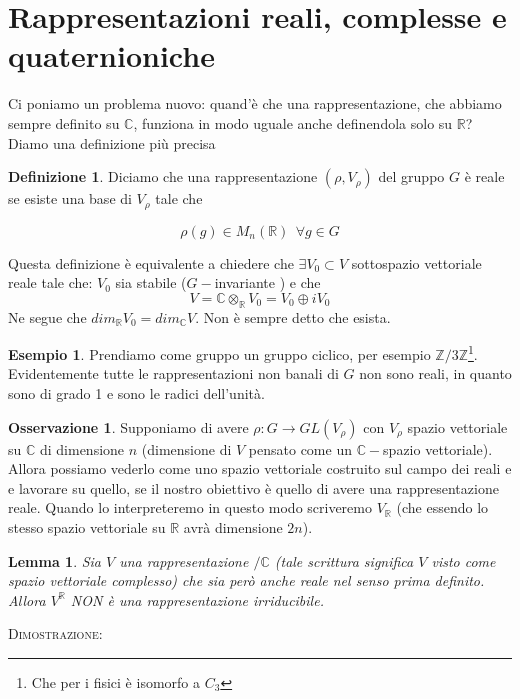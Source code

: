 \documentclass[11pt]{article}
\theoremstyle{plain}
\newtheorem{lemma}[thm]{Lemma}
\theoremstyle{definition}
\newtheorem{defn}{Definizione}[section]
\newtheorem{exmp}{Esempio}[section]
\newtheorem*{rem}{Osservazione}
\theoremstyle{remark}
\newcommand{\C}{\mathbb{C}}
\newcommand{\R}{\mathbb{R}}
\newcommand{\Z}{\mathbb{Z}}
\begin{document}
\newpage
\section{Rappresentazioni reali, complesse e quaternioniche}

Ci poniamo un problema nuovo: quand'è che una rappresentazione, che abbiamo sempre definito su $\C$, funziona in modo uguale anche definendola solo su $\R$? Diamo una definizione più precisa

\begin{defn}
Diciamo che una rappresentazione $(\rho, V_\rho)$ del gruppo $G$ è reale se esiste una base di $V_\rho$ tale che

\[ \rho(g) \in M_n(\R) \ \ \forall g \in G\]

\label{def: rappr reale}
\end{defn}
Questa definizione è equivalente a chiedere che $\exists V_0 \subset V$ sottospazio vettoriale reale tale che: $V_0$ sia stabile ($G-$invariante ) e che 
\[ V = \C \otimes_\R V_0 = V_0 \oplus i V_0\]
Ne segue che $dim_\R V_0=dim_\C V$. Non è sempre detto che esista.
\begin{exmp}
Prendiamo come gruppo un gruppo ciclico, per esempio $\Z / 3\Z$\footnote{Che per i fisici è isomorfo a $C_3$}. Evidentemente tutte le rappresentazioni non banali di $G$ non sono reali, in quanto sono di grado 1 e sono le radici dell'unità.

\end{exmp}


\begin{rem}
Supponiamo di avere $\rho: G \to GL(V_\rho)$ con $V_\rho$ spazio vettoriale su $\C$ di dimensione $n$ (dimensione di $V$ pensato come un $\C-$spazio vettoriale). Allora possiamo vederlo come uno spazio vettoriale costruito sul campo dei reali e  e lavorare su quello, se il nostro obiettivo è quello di avere una rappresentazione reale. Quando lo interpreteremo in questo modo scriveremo $V_\R$ (che essendo lo stesso spazio vettoriale su $\R$ avrà dimensione $2n$). 
\end{rem}



\begin{lemma}
Sia $V$ una rappresentazione $/\C$ (tale scrittura significa $V$ visto come spazio vettoriale complesso) che sia però anche reale nel senso prima definito. Allora $V^{\R} $ NON è una rappresentazione irriducibile. 
\end{lemma}

\textsc{Dimostrazione:}
\end{document}

